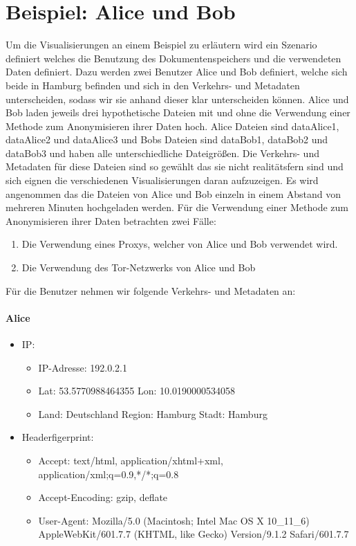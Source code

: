 \documentclass[
    fontsize=12pt,
    headings=small,
    parskip=half,           %
    bibliography=totoc,
    numbers=noenddot,       %
    open=any,               %
    ]{scrreprt}
\begin{document}
    \section{Beispiel: Alice und Bob}
Um die Visualisierungen an einem Beispiel zu erläutern wird ein Szenario definiert welches die Benutzung des Dokumentenspeichers und die verwendeten Daten definiert.
Dazu werden zwei Benutzer Alice und Bob definiert, welche sich beide in Hamburg befinden und sich in den Verkehrs- und Metadaten unterscheiden, sodass wir sie anhand dieser klar unterscheiden können.
Alice und Bob laden jeweils drei hypothetische Dateien mit und ohne die Verwendung einer Methode zum Anonymisieren ihrer Daten hoch.
Alice Dateien sind dataAlice1, dataAlice2 und dataAlice3 und Bobs Dateien sind dataBob1, dataBob2 und dataBob3 und haben alle unterschiedliche Dateigrößen.
Die Verkehrs- und Metadaten für diese Dateien sind so gewählt das sie nicht realitätsfern sind und sich eignen die verschiedenen Visualisierungen daran aufzuzeigen. 
Es wird angenommen das die Dateien von Alice und Bob einzeln in einem Abstand von mehreren Minuten hochgeladen werden.
Für die Verwendung einer Methode zum Anonymisieren ihrer Daten betrachten zwei Fälle:
\begin{enumerate}
\item Die Verwendung eines Proxys, welcher von Alice und Bob verwendet wird.
\item Die Verwendung des Tor-Netzwerks von Alice und Bob
\end{enumerate}

Für die Benutzer nehmen wir folgende Verkehrs- und Metadaten an: 
\paragraph{Alice}
\begin{itemize}
  \item IP: 
  \begin{itemize}
  \item IP-Adresse: 192.0.2.1
  \item Lat: 53.5770988464355 Lon: 10.0190000534058
  \item Land: Deutschland Region: Hamburg Stadt: Hamburg
  \end{itemize}
  \item Headerfigerprint:  
  \begin{itemize}
  \item Accept: text/html, application/xhtml+xml, application/xml;q=0.9,*/*;q=0.8
  \item Accept-Encoding: gzip, deflate
  \item User-Agent: Mozilla/5.0 (Macintosh; Intel Mac OS X 10\_11\_6) AppleWebKit/601.7.7 (KHTML, like Gecko) Version/9.1.2 Safari/601.7.7
  \end{itemize}
\end{itemize}
\end{document}
